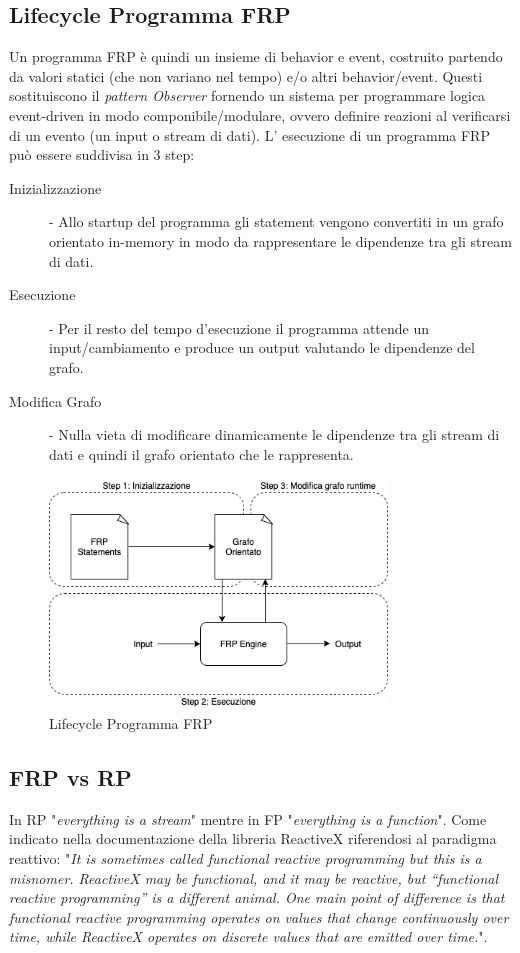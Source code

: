 \documentclass[../main.tex]{subfiles}
\begin{document}
\subsection{Lifecycle Programma FRP}
Un programma FRP è quindi un insieme di behavior e event, costruito partendo da valori statici (che non variano nel tempo) e/o altri behavior/event. Questi sostituiscono il \textit{pattern Observer} fornendo un sistema per programmare logica event-driven in modo componibile/modulare, ovvero definire reazioni al verificarsi di un evento (un input o stream di dati). L' esecuzione di un programma FRP può essere suddivisa in 3 step:
\begin{description}
    \item[Inizializzazione] - Allo startup del programma gli statement vengono convertiti in un grafo orientato in-memory in modo da rappresentare le dipendenze tra gli stream di dati.
    \item[Esecuzione] - Per il resto del tempo d'esecuzione il programma attende un input/cambiamento e produce un output valutando le dipendenze del grafo.
    \item[Modifica Grafo] - Nulla vieta di modificare dinamicamente le dipendenze tra gli stream di dati e quindi il grafo orientato che le rappresenta.
\end{description}

\begin{figure}[H]
\centering
\includegraphics[width=0.8\textwidth]{img/frp-scala1.png}
\caption{Lifecycle Programma FRP}
\end{figure}

\subsection{FRP vs RP}
In RP "\textit{everything is a stream}" mentre in FP "\textit{everything is a function}". Come indicato nella documentazione della libreria ReactiveX riferendosi al paradigma reattivo: "\textit{It is sometimes called functional reactive programming but this is a misnomer. ReactiveX may be functional, and it may be reactive, but “functional reactive programming” is a different animal. One main point of difference is that functional reactive programming operates on values that change continuously over time, while ReactiveX operates on discrete values that are emitted over time.}".
\end{document}
